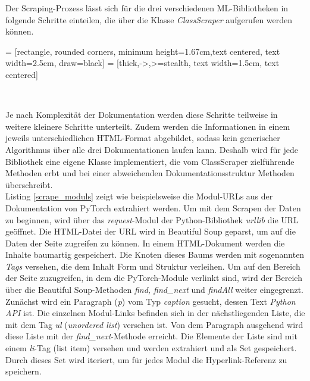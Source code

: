 \documentclass[german,bachelor]{swsLeipzig}
\begin{document}
\noindent Der Scraping-Prozess lässt sich für die drei verschiedenen ML-Bibliotheken in folgende Schritte einteilen, die über die Klasse
\textit{ClassScraper} aufgerufen werden können.

 = [rectangle, rounded corners, minimum height=1.67cm,text centered, text width=2.5cm, draw=black]
 = [thick,->,>=stealth, text width=1.5cm, text centered]

\begin{center}
\end{center}
\

\noindent Je nach Komplexität der Dokumentation werden diese Schritte teilweise in weitere kleinere Schritte unterteilt.
Zudem werden die Informationen in einem jeweils unterschiedlichen HTML-Format abgebildet,
sodass kein generischer Algorithmus über alle drei Dokumentationen laufen kann.
Deshalb wird für jede Bibliothek eine eigene Klasse implementiert, die vom ClassScraper zielführende Methoden erbt und
bei einer abweichenden Dokumentationsstruktur Methoden überschreibt. \\

\noindent Listing \ref{scrape_moduls} zeigt wie beispielsweise die Modul-URLs aus der Dokumentation von PyTorch extrahiert werden.
Um mit dem Scrapen der Daten zu beginnen, wird über das \textit{request}-Modul der Python-Bibliothek \textit{urllib} die URL geöffnet.
Die HTML-Datei der URL wird in Beautiful Soup geparst, um auf die Daten der Seite zugreifen zu können.
In einem HTML-Dokument werden die Inhalte baumartig gespeichert.
Die Knoten dieses Baums werden mit sogenannten \textit{Tags} versehen, die dem Inhalt Form und Struktur verleihen.
Um auf den Bereich der Seite zuzugreifen, in dem die PyTorch-Module verlinkt sind, wird der Bereich über die Beautiful Soup-Methoden
\textit{find, find\_next} und \textit{findAll} weiter eingegrenzt.
Zunächst wird ein Paragraph (\textit{p}) vom Typ \textit{caption} gesucht, dessen Text \textit{Python API} ist.
Die einzelnen Modul-Links befinden sich in der nächstliegenden Liste, die mit dem Tag \textit{ul} (\textit{unordered list})
versehen ist.
Von dem Paragraph ausgehend wird diese Liste mit der \textit{find\_next}-Methode erreicht.
Die Elemente der Liste sind mit einem \textit{li}-Tag (list item) versehen und werden extrahiert und als Set gespeichert.
Durch dieses Set wird iteriert, um für jedes Modul die Hyperlink-Referenz zu speichern.\\
\end{document}
